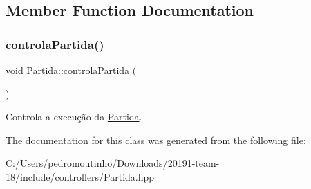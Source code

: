 \subsection{Member Function Documentation}
\mbox{\label{class_partida_ac33f17557cd766c7daccdc26dcaba906}} 
\subsubsection{\texorpdfstring{controlaPartida()}{controlaPartida()}}
{\footnotesize\ttfamily void Partida\+::controla\+Partida (\begin{DoxyParamCaption}{ }\end{DoxyParamCaption})}



Controla a execução da \mbox{\hyperlink{class_partida}{Partida}}. 



The documentation for this class was generated from the following file\+:\begin{DoxyCompactItemize}
\item 
C\+:/\+Users/pedromoutinho/\+Downloads/20191-\/team-\/18/include/controllers/Partida.\+hpp\end{DoxyCompactItemize}
